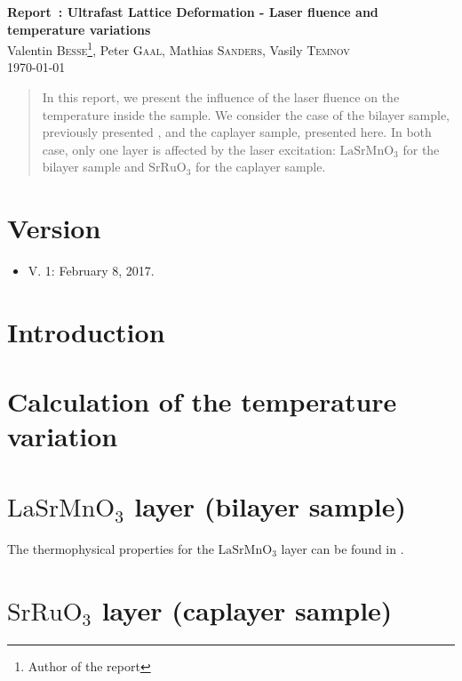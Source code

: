 \documentclass[12pt,a4paper,fleqn]{article}
\begin{document}
	
	
\begin{center}
	{\bf\Large Report~\MakeUppercase{}: Ultrafast Lattice Deformation - Laser fluence and temperature variations}\\
	\vspace{0.4cm}
	{\large Valentin \textsc{Besse}\footnote{Author of the report}, Peter \textsc{Gaal}, Mathias \textsc{Sanders}, Vasily \textsc{Temnov}}\\
	\vspace{0.6cm}
	{\large \today}
\end{center}
\vspace{0.1cm}

\begin{abstract}
	{\noindent In this report, we present the influence of the laser fluence on the temperature inside the sample.
    We consider the case of the bilayer sample, previously presented \cite{Besse_report1_2016,Besse_report2_2017,Besse_report3_2017}, and the caplayer sample, presented here.
    In both case, only one layer is affected by the laser excitation: $\mathrm{LaSrMnO}_3$ for the bilayer sample and $\mathrm{SrRuO}_3$ for the caplayer sample.}
\end{abstract}

\section{Version}

\begin{itemize}
	\item V. 1: February 8, 2017.
\end{itemize}

\section{Introduction}

\section{Calculation of the temperature variation}

\section{$\mathrm{LaSrMnO}_3$ layer (bilayer sample)}

The thermophysical properties for the $\mathrm{LaSrMnO}_3$ layer can be found in \cite{DLNiu_2005,Wdowik_2011}.

\section{$\mathrm{SrRuO}_3$ layer (caplayer sample)}


\end{document}
